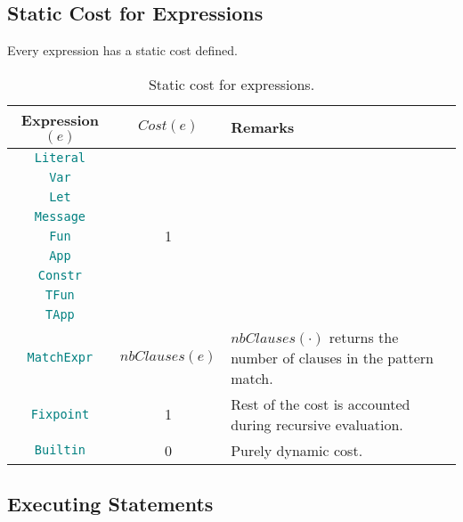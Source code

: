 \documentclass[9pt]{article}
\begin{document}
\subsection{Static Cost for Expressions}

Every expression has a static cost defined. 

\begin{table}[!hbt]
	\caption{Static cost for expressions. \label{tab:expressions} }
\centering
	\begin{tabular}{|c|c|p{6cm}|}
	\hline
		\textbf{Expression $(e)$} & \textbf{$Cost(e)$} & \textbf{Remarks} \\ \hline
		\texttt{\textcolor{teal}{Literal}}  & \multirow{9}{*}{1}  & \\
		\cline{1-1}
		\texttt{\textcolor{teal}{Var}}  &  & \\ \cline{1-1}
		\texttt{\textcolor{teal}{Let}}  &  & \\ \cline{1-1}
		\texttt{\textcolor{teal}{Message}}  &  & \\ \cline{1-1}
		\texttt{\textcolor{teal}{Fun}}  &  & \\ \cline{1-1}
		\texttt{\textcolor{teal}{App}}  &  & \\ \cline{1-1}
		\texttt{\textcolor{teal}{Constr}}  &  & \\ \cline{1-1}
		\texttt{\textcolor{teal}{TFun}}  &  & \\ \cline{1-1}
		\texttt{\textcolor{teal}{TApp}}  &  & \\ \hline
		\texttt{\textcolor{teal}{MatchExpr}}  & $nbClauses(e)$
		&$nbClauses(\cdot)$ returns the number of clauses in the pattern match.
		 \\ \hline
		\texttt{\textcolor{teal}{Fixpoint}}  & 1  & Rest of the cost is
		accounted during recursive evaluation. \\ \hline
		\texttt{\textcolor{teal}{Builtin}}  & 0 & Purely dynamic cost. \\ \hline
	\end{tabular}
	\end{table}
 

\subsection{Executing Statements}
\end{document}

